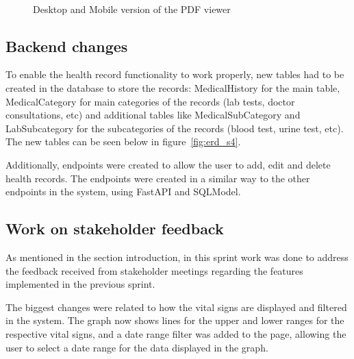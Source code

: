 \begin{figure}[ht]
  \centering
  \\[\baselineskip]
  \caption{Desktop and Mobile version of the PDF viewer}\label{fig:pdfviewer}
\end{figure}

\FloatBarrier{}

\subsection{Backend changes}

To enable the health record functionality to work properly, new tables had to be created in the database to store the records: MedicalHistory for the main table, MedicalCategory for main categories of the records (lab tests, doctor consultations, etc) and additional tables like MedicalSubCategory and LabSubcategory for the subcategories of the records (blood test, urine test, etc). The new tables can be seen below in figure~\ref{fig:erd_s4}.

\noindent\begin{minipage}{\textwidth}
  \begin{center}
      \label{fig:erd_s4}
  \end{center}
\end{minipage}

\FloatBarrier{}

Additionally, endpoints were created to allow the user to add, edit and delete health records. The endpoints were created in a similar way to the other endpoints in the system, using FastAPI and SQLModel.

\subsection{Work on stakeholder feedback}

As mentioned in the section introduction, in this sprint work was done to address the feedback received from stakeholder meetings regarding the features implemented in the previous sprint.

The biggest changes were related to how the vital signs are displayed and filtered in the system. The graph now shows lines for the upper and lower ranges for the respective vital signs, and a date range filter was added to the page, allowing the user to select a date range for the data displayed in the graph. 

